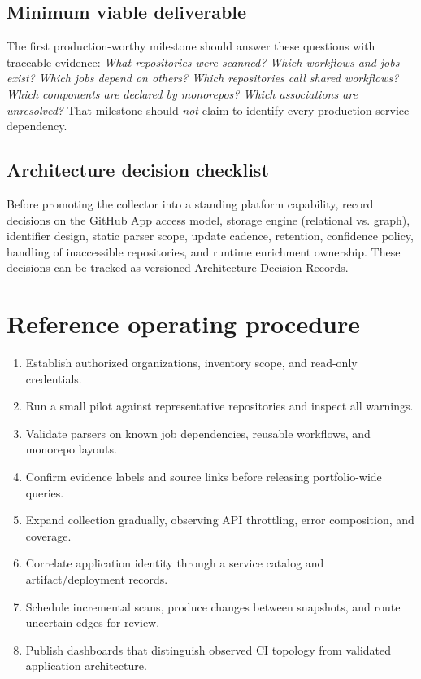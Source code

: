 \documentclass[11pt,letterpaper]{article}
\begin{document}
\subsection{Minimum viable deliverable}
The first production-worthy milestone should answer these questions with traceable evidence: \emph{What repositories were scanned? Which workflows and jobs exist? Which jobs depend on others? Which repositories call shared workflows? Which components are declared by monorepos? Which associations are unresolved?} That milestone should \emph{not} claim to identify every production service dependency.

\subsection{Architecture decision checklist}
Before promoting the collector into a standing platform capability, record decisions on the GitHub App access model, storage engine (relational vs. graph), identifier design, static parser scope, update cadence, retention, confidence policy, handling of inaccessible repositories, and runtime enrichment ownership. These decisions can be tracked as versioned Architecture Decision Records.

\section{Reference operating procedure}
\begin{enumerate}
\item Establish authorized organizations, inventory scope, and read-only credentials.
\item Run a small pilot against representative repositories and inspect all warnings.
\item Validate parsers on known job dependencies, reusable workflows, and monorepo layouts.
\item Confirm evidence labels and source links before releasing portfolio-wide queries.
\item Expand collection gradually, observing API throttling, error composition, and coverage.
\item Correlate application identity through a service catalog and artifact/deployment records.
\item Schedule incremental scans, produce changes between snapshots, and route uncertain edges for review.
\item Publish dashboards that distinguish observed CI topology from validated application architecture.
\end{enumerate}
\end{document}
